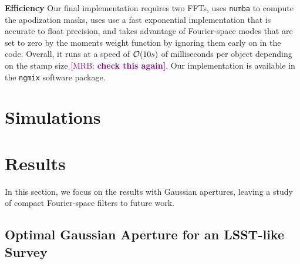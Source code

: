 \documentclass[twocolappendix, appendixfloats, numberedappendix, twocolumn, apj]{openjournal}
\newcommand{\mrb}[1]{\textcolor{purple}{[MRB: \bf #1]}\xspace}
\begin{document}
\textbf{Efficiency} Our final implementation requires two FFTs, uses \texttt{numba} to compute the
apodization masks, uses use a fast exponential implementation that is accurate to float precision,
and takes advantage of Fourier-space modes that are set to zero by the moments weight function by ignoring
them early on in the code. Overall, it runs at a speed of ${\cal O}(10s)$ of milliseconds per
object depending on the stamp size \mrb{check this again}. Our implementation is available in the
\texttt{ngmix} software package.

\section{Simulations}


\section{Results}

In this section, we focus on the results with Gaussian apertures, leaving a study of
compact Fourier-space filters to future work.

\subsection{Optimal Gaussian Aperture for an LSST-like Survey}
\end{document}
